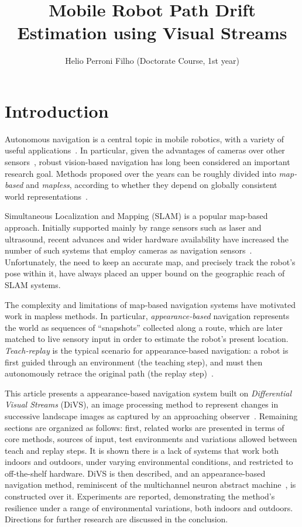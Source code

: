 \documentclass[twocolumn, 9pt,fleqn]{jsproceedings}
\title{Mobile Robot Path Drift Estimation using Visual Streams}
\author{Helio Perroni Filho (Doctorate Course, 1st year)\authorrefmark{1}}
\affiliation{Intelligent Robotics Laboratory, OHYA's group}
\begin{document}
\thispagestyle{myheadings}
\maketitle


\section{Introduction}

Autonomous navigation is a central topic in mobile robotics, with a variety of useful applications~\cite{BON02,ARK90}. In particular, given the advantages of cameras over other sensors~\cite{BON02,DAV07}, robust vision-based navigation has long been considered an important research goal. Methods proposed over the years can be roughly divided into \textit{map-based} and \textit{mapless}, according to whether they depend on globally consistent world representations~\cite{BON02}.

Simultaneous Localization and Mapping (SLAM) is a popular map-based approach. Initially supported mainly by range sensors such as laser and ultrasound, recent advances and wider hardware availability have increased the number of such systems that employ cameras as navigation sensors~\cite{DAV07,CUM08}. Unfortunately, the need to keep an accurate map, and precisely track the robot's pose within it, have always placed an upper bound on the geographic reach of SLAM systems.

The complexity and limitations of map-based navigation systems have motivated work in mapless methods. In particular, \textit{appearance-based} navigation represents the world as sequences of ``snapshots'' collected along a route, which are later matched to live sensory input in order to estimate the robot's present location. \textit{Teach-replay} is the typical scenario for appearance-based navigation: a robot is first guided through an environment (the teaching step), and must then autonomously retrace the original path (the replay step)~\cite{BUR01}.

This article presents a appearance-based navigation system built on \textit{Differential Visual Streams} (DiVS), an image processing method to represent changes in successive landscape images as captured by an approaching observer~\cite{HEL14a}. Remaining sections are organized as follows: first, related works are presented in terms of core methods, sources of input, test environments and variations allowed between teach and replay steps. It is shown there is a lack of systems that work both indoors and outdoors, under varying environmental conditions, and restricted to off-the-shelf hardware. DiVS is then described, and an appearance-based navigation method, reminiscent of the multichannel neuron abstract machine~\cite{HEL14b}, is constructed over it. Experiments are reported, demonstrating the method's resilience under a range of environmental variations, both indoors and outdoors. Directions for further research are discussed in the conclusion.
\end{document}
